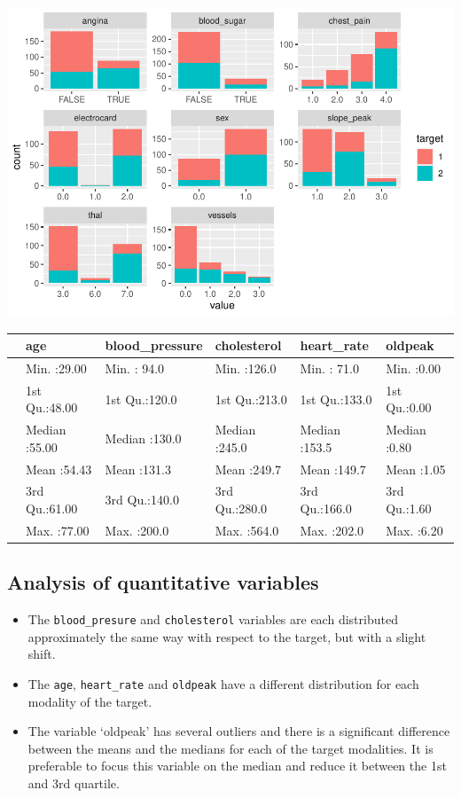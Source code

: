 \documentclass[
]{article}
\providecommand{\tightlist}{%
  \setlength{\itemsep}{0pt}\setlength{\parskip}{0pt}}
\begin{document}
\includegraphics{hd_files/figure-latex/unnamed-chunk-14-1.pdf}

\begin{tabular}[t]{llllll}
\toprule
  &      age & blood\_pressure &  cholesterol &   heart\_rate &    oldpeak\\
\midrule
 & Min.   :29.00 & Min.   : 94.0 & Min.   :126.0 & Min.   : 71.0 & Min.   :0.00\\
 & 1st Qu.:48.00 & 1st Qu.:120.0 & 1st Qu.:213.0 & 1st Qu.:133.0 & 1st Qu.:0.00\\
 & Median :55.00 & Median :130.0 & Median :245.0 & Median :153.5 & Median :0.80\\
 & Mean   :54.43 & Mean   :131.3 & Mean   :249.7 & Mean   :149.7 & Mean   :1.05\\
 & 3rd Qu.:61.00 & 3rd Qu.:140.0 & 3rd Qu.:280.0 & 3rd Qu.:166.0 & 3rd Qu.:1.60\\
\addlinespace
 & Max.   :77.00 & Max.   :200.0 & Max.   :564.0 & Max.   :202.0 & Max.   :6.20\\
\bottomrule
\end{tabular}

\hypertarget{analysis-of-quantitative-variables}{%
\subsection{Analysis of quantitative
variables}\label{analysis-of-quantitative-variables}}

\begin{itemize}
\tightlist
\item
  The \texttt{blood\_presure} and \texttt{cholesterol} variables are
  each distributed approximately the same way with respect to the
  target, but with a slight shift.
\item
  The \texttt{age}, \texttt{heart\_rate} and \texttt{oldpeak} have a
  different distribution for each modality of the target.
\item
  The variable `oldpeak' has several outliers and there is a significant
  difference between the means and the medians for each of the target
  modalities. It is preferable to focus this variable on the median and
  reduce it between the 1st and 3rd quartile.
\end{itemize}
\end{document}
